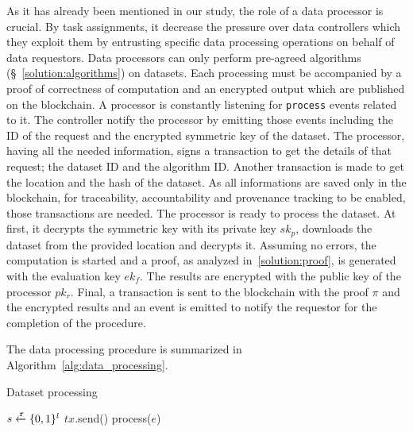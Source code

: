 As it has already been mentioned in our study, the role of a data processor is crucial. By task assignments, it decrease the pressure over data controllers which they exploit them by entrusting specific data processing operations on behalf of data requestors. Data processors can only perform pre-agreed algorithms (§~\ref{solution:algorithms}) on datasets. Each processing must be accompanied by a proof of correctness of computation and an encrypted output which are published on the blockchain. A processor is constantly listening for \verb|process| events related to it. The controller notify the processor by emitting those events including the ID of the request and the encrypted symmetric key of the dataset. The processor, having all the needed information, signs a transaction to get the details of that request; the dataset ID and the algorithm ID. Another transaction is made to get the location and the hash of the dataset. As all informations are saved only in the blockchain, for traceability, accountability and provenance tracking to be enabled, those transactions are needed. The processor is ready to process the dataset. At first, it decrypts the symmetric key with its private key $sk_p$, downloads the dataset from the provided location and decrypts it. Assuming no errors, the computation is started and a proof, as analyzed in~\ref{solution:proof}, is generated with the evaluation key $ek_f$. The results are encrypted with the public key of the processor $pk_r$. Final, a transaction is sent to the blockchain with the proof $\pi$ and the encrypted results and an event is emitted to notify the requestor for the completion of the procedure.

The data processing procedure is summarized in Algorithm~\ref{alg:data_processing}.

\begin{algorithm}[!htb]
  \caption{Dataset processing}\label{alg:data_processing}
  \begin{algorithmic}[1]
     
     
     
     
     
    \State $s \xleftarrow{\mathtt{r}}{\{0, 1\}^{l}}$ 
     
     
     
     
    \State $tx$.send()
  \EndProcedure
     
      \State process($e$) 
    \EndWhile
  \EndProcedure
  \end{algorithmic}
\end{algorithm}

